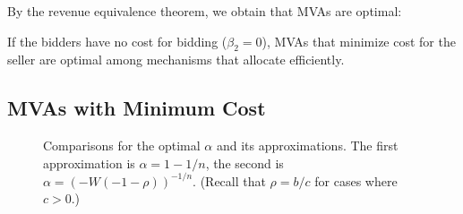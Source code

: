 By the revenue equivalence theorem,  we obtain that MVAs are optimal:

\begin{corollary}
If the bidders have no cost for bidding ($\beta_2=0$), MVAs 
that minimize cost for the seller
are optimal
among mechanisms that allocate efficiently.
\end{corollary}

\subsection{MVAs with Minimum Cost}
\label{sec:alpha-MVA}

\begin{figure}
\centering
  \caption{Comparisons for the optimal $\alpha$ and its approximations. The first
  approximation is $\alpha = 1-1/n$, the second is $\alpha =
  (-W(-1-\rho))^{-1/n}$. (Recall that $\rho = b/c$ for cases where $c > 0$.)}
  \label{fig:alpha}
\end{figure}

